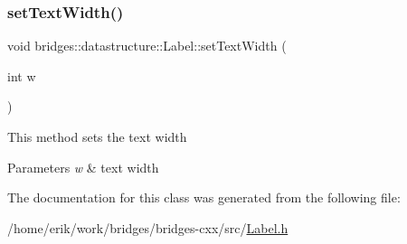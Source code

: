 \subsubsection{\texorpdfstring{set\+Text\+Width()}{setTextWidth()}}
{\footnotesize\ttfamily void bridges\+::datastructure\+::\+Label\+::set\+Text\+Width (\begin{DoxyParamCaption}\item[{int}]{w }\end{DoxyParamCaption})\hspace{0.3cm}{\ttfamily [inline]}}

This method sets the text width


\begin{DoxyParams}{Parameters}
{\em w} & text width \\
\hline
\end{DoxyParams}


The documentation for this class was generated from the following file\+:\begin{DoxyCompactItemize}
\item 
/home/erik/work/bridges/bridges-\/cxx/src/\hyperlink{_label_8h}{Label.\+h}\end{DoxyCompactItemize}
